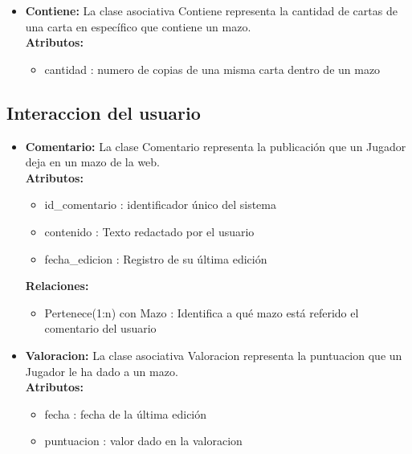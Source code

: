 \documentclass[10pt]{article}
\begin{document}
\begin{itemize}
		\item \textbf{Contiene:} La clase asociativa Contiene representa la cantidad de cartas de una carta en específico que contiene un mazo.\\
		\textbf{Atributos:}
		\begin{itemize}
			\item cantidad : numero de copias de una misma carta dentro de un mazo
		\end{itemize}		
	\end{itemize}
	
	\subsection{Interaccion del usuario}
	\begin{itemize}
		\item \textbf{Comentario:} La clase Comentario representa la publicación que un Jugador deja en un mazo de la web.\\
		\textbf{Atributos:}
		\begin{itemize}
			\item id\_comentario : identificador único del sistema
			\item contenido : Texto redactado por el usuario
			\item fecha\_edicion : Registro de su última edición 
		\end{itemize}
		\textbf{Relaciones:}
		\begin{itemize}
			\item Pertenece(1:n) con Mazo : Identifica a qué mazo está referido el comentario del usuario
		\end{itemize}
		
		\item \textbf{Valoracion:} La clase asociativa Valoracion representa la puntuacion que un Jugador le ha dado a un mazo.\\
		\textbf{Atributos:}
		\begin{itemize}
			\item fecha : fecha de la última edición
			\item puntuacion : valor dado en la valoracion
		\end{itemize}
	\end{itemize}
	
\end{document}
